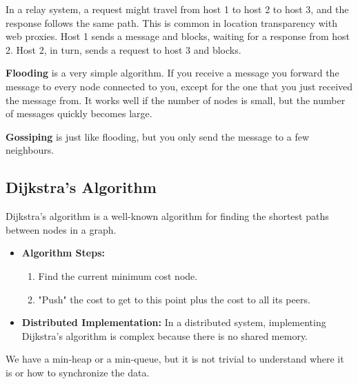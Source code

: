 In a relay system, a request might travel from host 1 to host 2 to host 3, and the response follows the same path.  This is common in location transparency with web proxies.  Host 1 sends a message and blocks, waiting for a response from host 2. Host 2, in turn, sends a request to host 3 and blocks.

\textbf{Flooding} is a very simple algorithm. If you receive a message you forward the message to every node connected to you, except for the one that you just received the message from. It works well if the number of nodes is small, but the number of messages quickly becomes large.

\textbf{Gossiping} is just like flooding, but you only send the message to a few neighbours.

\subsection{Dijkstra's Algorithm}

Dijkstra's algorithm is a well-known algorithm for finding the shortest paths between nodes in a graph.

\begin{itemize}
    \item \textbf{Algorithm Steps:}
    \begin{enumerate}[itemsep=1pt, topsep=1pt]
        \item Find the current minimum cost node.
        \item "Push" the cost to get to this point plus the cost to all its peers.
    \end{enumerate}
    \item \textbf{Distributed Implementation:} In a distributed system, implementing Dijkstra's algorithm is complex because there is no shared memory.
\end{itemize}
We have a min-heap or a min-queue, but it is not trivial to understand where it is or how to synchronize the data.
